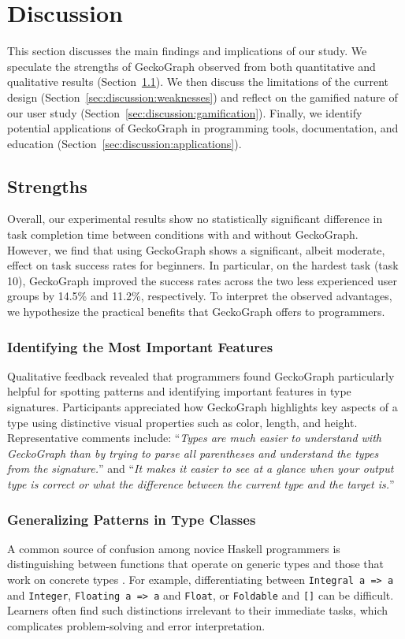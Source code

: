 \documentclass[preprint,12pt]{elsarticle}
\begin{document}
\section{Discussion} \label{sec:discussion}

This section discusses the main findings and implications of our study. 
We speculate the strengths of GeckoGraph observed from both quantitative and qualitative results (Section~\ref{sec:discussion:strengths}). 
We then discuss the limitations of the current design (Section~\ref{sec:discussion:weaknesses}) and reflect on the gamified nature of our user study (Section~\ref{sec:discussion:gamification}). 
Finally, we identify potential applications of GeckoGraph in programming tools, documentation, and education (Section~\ref{sec:discussion:applications}).

\subsection{Strengths}\label{sec:discussion:strengths}
Overall, our experimental results show no statistically significant difference in task completion time between conditions with and without GeckoGraph. However, we find that using GeckoGraph shows a significant, albeit moderate, effect on task success rates for beginners. In particular, on the hardest task (task 10), GeckoGraph improved the success rates across the two less experienced user groups by 14.5\% and 11.2\%, respectively. 
To interpret the observed advantages, we hypothesize the practical benefits that GeckoGraph offers to programmers.

\subsubsection{Identifying the Most Important Features}
Qualitative feedback revealed that programmers found GeckoGraph particularly helpful for spotting patterns and identifying important features in type signatures. 
Participants appreciated how GeckoGraph highlights key aspects of a type using distinctive visual properties such as color, length, and height. 
Representative comments include: 
``{\it Types are much easier to understand with GeckoGraph than by trying to parse all parentheses and understand the types from the signature.}'' and 
``{\it It makes it easier to see at a glance when your output type is correct or what the difference between the current type and the target is.}''

\subsubsection{Generalizing Patterns in Type Classes}
A common source of confusion among novice Haskell programmers is distinguishing between functions that operate on generic types and those that work on concrete types \cite{Tirronen2015-nr}. 
For example, differentiating between {\tt Integral a => a} and {\tt Integer}, {\tt Floating a => a} and {\tt Float}, or {\tt Foldable} and {\tt []} can be difficult. 
Learners often find such distinctions irrelevant to their immediate tasks, which complicates problem-solving and error interpretation.
\end{document}
